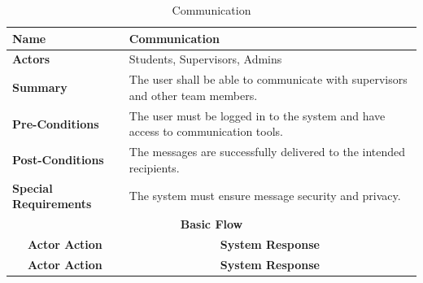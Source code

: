 \documentclass{FastFyp}
\begin{document}
\begin{longtable}{|lllll|}
\caption{Communication} \label{tab:communication} \\ \hline
\multicolumn{2}{|l|}{\textbf{Name}} &
  \multicolumn{3}{l|}{Communication} \\ \hline
\multicolumn{2}{|l|}{\textbf{Actors}} &
  \multicolumn{3}{l|}{Students, Supervisors, Admins} \\ \hline
\multicolumn{2}{|l|}{\textbf{Summary}} &
  \multicolumn{3}{l|}{The user shall be able to communicate with supervisors and other team members.} \\ \hline
\multicolumn{2}{|l|}{\textbf{Pre-Conditions}} &
  \multicolumn{3}{l|}{The user must be logged in to the system and have access to communication tools.} \\ \hline
\multicolumn{2}{|l|}{\textbf{Post-Conditions}} &
  \multicolumn{3}{l|}{The messages are successfully delivered to the intended recipients.} \\ \hline
\multicolumn{2}{|l|}{\textbf{Special Requirements}} &
  \multicolumn{3}{l|}{The system must ensure message security and privacy.} \\ \hline
\multicolumn{5}{|c|}{\textbf{Basic Flow}} \\ \hline
\multicolumn{3}{|c|}{\textbf{Actor Action}} &
  \multicolumn{2}{c|}{\textbf{System Response}} \\ \hline
\endfirsthead
\hline
\multicolumn{3}{|c|}{\textbf{Actor Action}} &
  \multicolumn{2}{c|}{\textbf{System Response}} \\ \hline
\endhead


\end{longtable}
\end{document}
